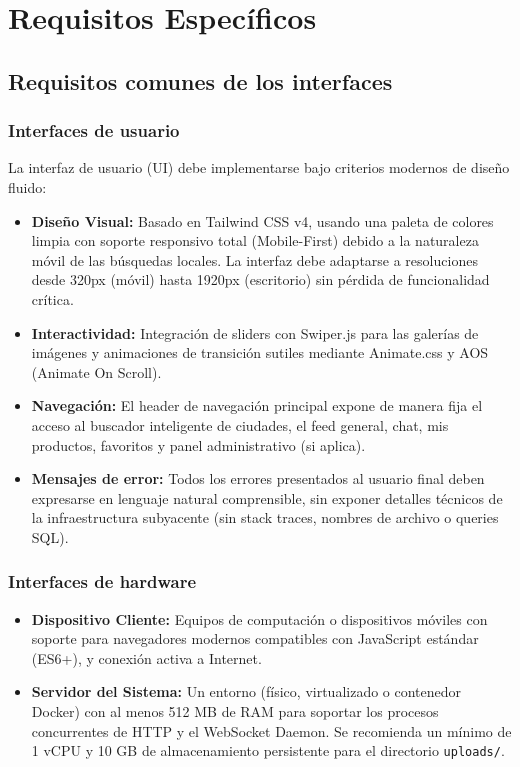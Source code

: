 \documentclass[11pt,a4paper]{report}
\begin{document}
\newpage

\chapter{Requisitos Específicos}

\section{Requisitos comunes de los interfaces}

\subsection{Interfaces de usuario}
La interfaz de usuario (UI) debe implementarse bajo criterios modernos de diseño fluido:
\begin{itemize}
    \item \textbf{Diseño Visual:} Basado en Tailwind CSS v4, usando una paleta de colores limpia con soporte responsivo total (Mobile-First) debido a la naturaleza móvil de las búsquedas locales. La interfaz debe adaptarse a resoluciones desde 320px (móvil) hasta 1920px (escritorio) sin pérdida de funcionalidad crítica.
    \item \textbf{Interactividad:} Integración de sliders con Swiper.js para las galerías de imágenes y animaciones de transición sutiles mediante Animate.css y AOS (Animate On Scroll).
    \item \textbf{Navegación:} El header de navegación principal expone de manera fija el acceso al buscador inteligente de ciudades, el feed general, chat, mis productos, favoritos y panel administrativo (si aplica).
    \item \textbf{Mensajes de error:} Todos los errores presentados al usuario final deben expresarse en lenguaje natural comprensible, sin exponer detalles técnicos de la infraestructura subyacente (sin stack traces, nombres de archivo o queries SQL).
\end{itemize}

\subsection{Interfaces de hardware}
\begin{itemize}
    \item \textbf{Dispositivo Cliente:} Equipos de computación o dispositivos móviles con soporte para navegadores modernos compatibles con JavaScript estándar (ES6+), y conexión activa a Internet.
    \item \textbf{Servidor del Sistema:} Un entorno (físico, virtualizado o contenedor Docker) con al menos 512 MB de RAM para soportar los procesos concurrentes de HTTP y el WebSocket Daemon. Se recomienda un mínimo de 1 vCPU y 10 GB de almacenamiento persistente para el directorio \texttt{uploads/}.
\end{itemize}
\end{document}
